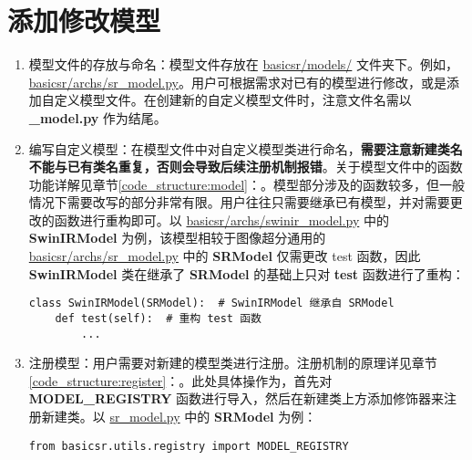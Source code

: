 \documentclass[../main.tex]{subfiles}
\begin{document}
\section{添加修改模型}\label{howto:add_model}

\begin{enumerate}[第 1 步]
    \item 模型文件的存放与命名：模型文件存放在 \href{https://github.com/XPixelGroup/BasicSR/tree/master/basicsr/models}{basicsr/models/} 文件夹下。例如，\href{https://github.com/XPixelGroup/BasicSR/tree/master/basicsr/models}{basicsr/archs/sr\_model.py}。用户可根据需求对已有的模型进行修改，或是添加自定义模型文件。在创建新的自定义模型文件时，注意文件名需以  \textbf{\_model.py} 作为结尾。

    \item 编写自定义模型：在模型文件中对自定义模型类进行命名，\textbf{需要注意新建类名不能与已有类名重复，否则会导致后续注册机制报错}。关于模型文件中的函数功能详解见章节\ref{code_structure:model}：。模型部分涉及的函数较多，但一般情况下需要改写的部分非常有限。用户往往只需要继承已有模型，并对需要更改的函数进行重构即可。以 \href{https://github.com/XPixelGroup/BasicSR/tree/master/basicsr/models}{basicsr/archs/swinir\_model.py} 中的 \textbf{SwinIRModel} 为例，该模型相较于图像超分通用的 \href{https://github.com/XPixelGroup/BasicSR/tree/master/basicsr/models}{basicsr/archs/sr\_model.py} 中的 \textbf{SRModel} 仅需更改 test 函数，因此 \textbf{SwinIRModel} 类在继承了 \textbf{SRModel} 的基础上只对 \textbf{test} 函数进行了重构：

          \begin{verbatim}
class SwinIRModel(SRModel):  # SwinIRModel 继承自 SRModel
    def test(self):  # 重构 test 函数
        ...
\end{verbatim}

    \item 注册模型：用户需要对新建的模型类进行注册。注册机制的原理详见章节\ref{code_structure:register}：。此处具体操作为，首先对 \textbf{MODEL\_REGISTRY} 函数进行导入，然后在新建类上方添加修饰器来注册新建类。以 \href{https://github.com/XPixelGroup/BasicSR/tree/master/basicsr/models/sr_model.py}{sr\_model.py} 中的 \textbf{SRModel} 为例：

          \begin{verbatim}
from basicsr.utils.registry import MODEL_REGISTRY


\end{verbatim}
\end{enumerate}
\end{document}

